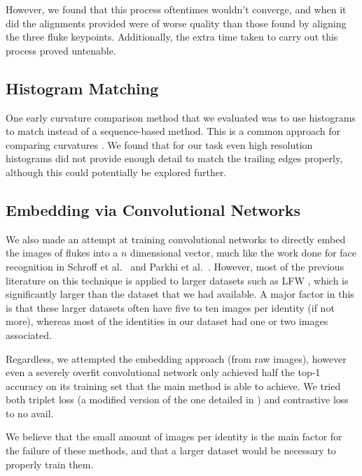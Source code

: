However, we found that this process oftentimes wouldn't converge, and when it did the alignments provided were of worse quality than those found by aligning the three fluke keypoints.
Additionally, the extra time taken to carry out this process proved untenable.

\subsection{Histogram Matching}

One early curvature comparison method that we evaluated was to use histograms to match instead of a sequence-based method.
This is a common approach for comparing curvatures \cite{kumar2012leafsnap}.
We found that for our task even high resolution histograms did not provide enough detail to match the trailing edges properly, although this could potentially be explored further.

\subsection{Embedding via Convolutional Networks}

We also made an attempt at training convolutional networks to directly embed the images of flukes into a $n$ dimensional vector, much like the work done for face recognition in Schroff et al.\ \cite{schroff2015facenet} and Parkhi et al.\ \cite{parkhi2015deep}.
However, most of the previous literature on this technique is applied to larger datasets such as LFW \cite{huang2007labeled}, which is significantly larger than the dataset that we had available.
A major factor in this is that these larger datasets often have five to ten images per identity (if not more), whereas most of the identities in our dataset had one or two images associated.

Regardless, we attempted the embedding approach (from raw images), however even a severely overfit convolutional network only achieved half the top-1 accuracy on its training set that the main method is able to achieve.
We tried both triplet loss (a modified version of the one detailed in \cite{schroff2015facenet}) and contrastive loss \cite{hadsell2006dimensionality} to no avail.

We believe that the small amount of images per identity is the main factor for the failure of these methods, and that a larger dataset would be necessary to properly train them.

